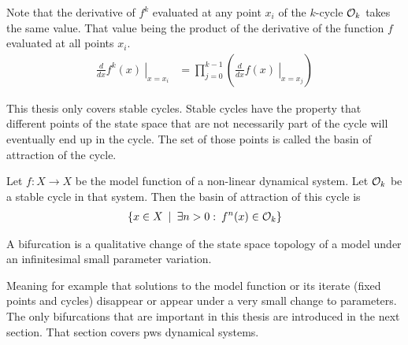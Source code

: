 Note that the derivative of $f^k$ evaluated at any point $x_i$ of the $k$-cycle $\mathcal{O}_k$ takes the same value.
That value being the product of the derivative of the function $f$ evaluated at all points $x_i$.
\begin{align}
	\left. \frac{d}{dx}f^k(x) \:\right|_{x = x_i} & = \prod_{j=0}^{k-1} \left( \left. \frac{d}{dx} f(x) \:\right|_{x = x_j} \right)
\end{align}

This thesis only covers stable cycles.
Stable cycles have the property that different points of the state space that are not necessarily part of the cycle will eventually end up in the cycle.
The set of those points is called the basin of attraction of the cycle.

\begin{definition}
	Let $f: X \to X$ be the model function of a non-linear dynamical system.
	Let $\mathcal{O}_k$ be a stable cycle in that system.
	Then the basin of attraction of this cycle is
	\begin{align}
		\left\{x \in X \:\mid\: \exists n > 0: \:f^n(x) \in \mathcal{O}_k\right\}
	\end{align}
\end{definition}

\begin{definition}[Bifurcation]
	A bifurcation is a qualitative change of the state space topology of a model under an infinitesimal small parameter variation.
\end{definition}
Meaning for example that solutions to the model function or its iterate (fixed points and cycles) disappear or appear under a very small change to parameters.
The only bifurcations that are important in this thesis are introduced in the next section.
That section covers \gls{pws} dynamical systems.
